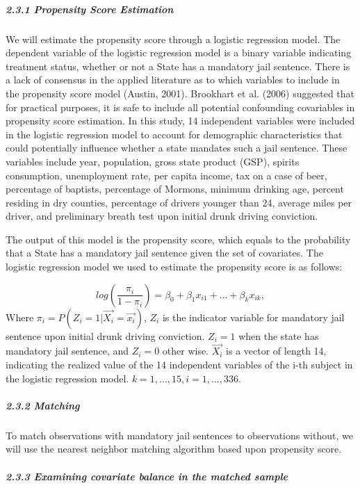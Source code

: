 \documentclass[]{article}
\let\oldsubparagraph\subparagraph
\renewcommand{\subparagraph}[1]{\oldsubparagraph{#1}\mbox{}}
\begin{document}
\hypertarget{propensity-score-estimation}{%
\subparagraph{2.3.1 Propensity Score Estimation}\label{propensity-score-estimation}}

We will estimate the propensity score through a logistic regression model. The dependent variable of the logistic regression model is a binary variable indicating treatment status, whether or not a State has a mandatory jail sentence. There is a lack of consensus in the applied literature as to which variables to include in the propensity score model (Austin, 2001). Brookhart et al. (2006) suggested that for practical purposes, it is safe to include all potential confounding covariables in propensity score estimation. In this study, 14 independent variables were included in the logistic regression model to account for demographic characteristics that could potentially influence whether a state mandates such a jail sentence. These variables include year, population, gross state product (GSP), spirits consumption, unemployment rate, per capita income, tax on a case of beer, percentage of baptists, percentage of Mormons, minimum drinking age, percent residing in dry counties, percentage of drivers younger than 24, average miles per driver, and preliminary breath test upon initial drunk driving conviction.

The output of this model is the propensity score, which equals to the probability that a State has a mandatory jail sentence given the set of covariates. The logistic regression model we used to estimate the propensity score is as follows:

\[
log(\frac{\pi_i}{1-\pi_i}) = \beta_0 + \beta_1x_{i1} + ... + \beta_kx_{ik}, 
\]
Where \(\pi_i = P(Z_i = 1 | \overrightarrow{X_i} = \overrightarrow{x_i})\), \(Z_i\) is the indicator variable for mandatory jail sentence upon initial drunk driving conviction. \(Z_i = 1\) when the state has mandatory jail sentence, and \(Z_i = 0\) other wise. \(\overrightarrow{X_i}\) is a vector of length 14, indicating the realized value of the 14 independent variables of the i-th subject in the logistic regression model. \(k = 1, ..., 15, i = 1,...,336\).

\hypertarget{matching}{%
\subparagraph{2.3.2 Matching}\label{matching}}

To match observations with mandatory jail sentences to observations without, we will use the nearest neighbor matching algorithm based upon propensity score.

\hypertarget{examining-covariate-balance-in-the-matched-sample-1}{%
\subparagraph{2.3.3 Examining covariate balance in the matched sample}\label{examining-covariate-balance-in-the-matched-sample-1}}
\end{document}
